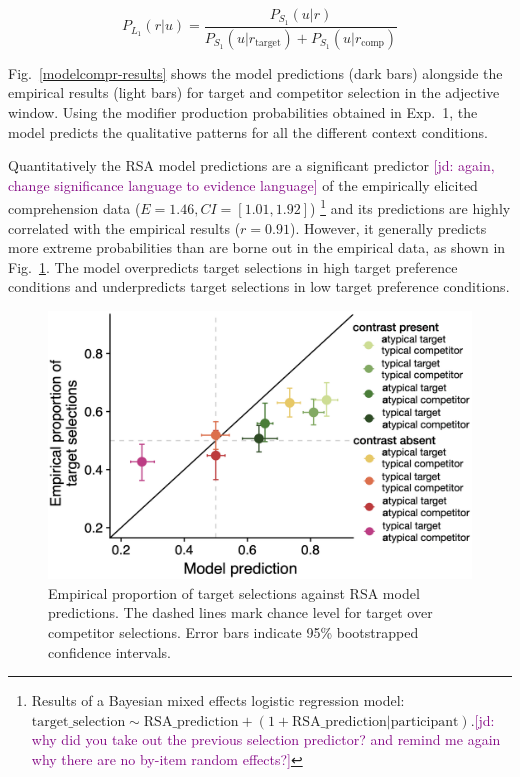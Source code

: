 \documentclass[10pt,letterpaper]{article}
\newcommand{\jd}[1]{\textcolor{Purple}{[jd: #1]}}
\newcommand{\figref}[1]{Fig.~\ref{#1}}
\begin{document}
\begin{equation}
	P_{L_1}(r|u) = \frac{P_{S_1}(u|r)}{P_{S_1}(u|r_{\text{target}}) + P_{S_1}(u|r_{\text{comp}})}
\label{eq-flatprior}
\end{equation}

\figref{modelcompr-results} shows the model predictions (dark bars) alongside the empirical results (light bars) for target and competitor selection in the adjective window. Using the modifier production probabilities obtained in Exp.~1, the model predicts the qualitative patterns for all the different context conditions. 

Quantitatively the RSA model predictions are a significant predictor \jd{again, change significance language to evidence language} of the empirically elicited comprehension data ($E=1.46, CI=[1.01, 1.92]$)
\footnote{Results of a Bayesian mixed effects logistic regression model: $\text{target\_selection} \sim \text{RSA\_prediction} + (1+\text{RSA\_prediction}|\text{participant})$.\jd{why did you take out the previous selection predictor? and remind me again why there are no by-item random effects?}} 
and its predictions are highly correlated with the empirical results ($r=0.91$). However, it generally predicts more extreme probabilities than are borne out in the empirical data, as shown in \figref{model-results-corr-flatprior}. The model overpredicts target selections in high target preference conditions and underpredicts target selections in low target preference conditions. 

\begin{figure}
	\begin{center}
		\includegraphics[width=.475\textwidth]{graphs/corr-plot.pdf}
	\end{center}
\caption{Empirical proportion of target selections against RSA model predictions. The dashed lines mark chance level for target over competitor selections. Error bars indicate 95\% bootstrapped confidence intervals.} 
\label{model-results-corr-flatprior}
\end{figure}
\end{document}
